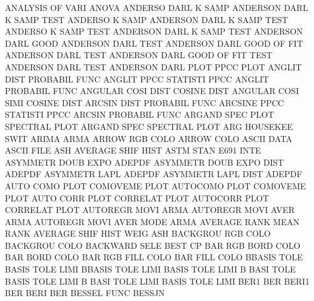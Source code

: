 ANALYSIS OF   VARI                      ANOVA
ANDERSO  DARL K    SAMP                 ANDERSON DARL K    SAMP TEST
ANDERSO  K    SAMP                      ANDERSON DARL K    SAMP TEST
ANDERSO  K    SAMP TEST                 ANDERSON DARL K    SAMP TEST
ANDERSON DARL GOOD                      ANDERSON DARL TEST
ANDERSON DARL GOOD OF   FIT             ANDERSON DARL TEST
ANDERSON DARL GOOD OF   FIT  TEST       ANDERSON DARL TEST
ANDERSON DARL PLOT                      PPCC     PLOT
ANGLIT   DIST                           PROBABIL FUNC
ANGLIT   PPCC                           STATISTI PPCC
ANGLIT                                  PROBABIL FUNC
ANGULAR  COSI DIST                      COSINE   DIST
ANGULAR  COSI SIMI                      COSINE   DIST
ARCSIN   DIST                           PROBABIL FUNC
ARCSINE  PPCC                           STATISTI PPCC
ARCSIN                                  PROBABIL FUNC
ARGAND   SPEC PLOT                      SPECTRAL PLOT
ARGAND   SPEC                           SPECTRAL PLOT
ARG                                     HOUSEKEE SWIT
ARIMA                                   ARMA
ARROW    RGB  COLO                      ARROW    COLO
ASCII    DATA                           ASCII    FILE
ASH                                     AVERAGE  SHIF HIST
ASTM     STAN                           E691     INTE
ASYMMETR DOUB EXPO                      ADEPDF
ASYMMETR DOUB EXPO DIST                 ADEPDF
ASYMMETR LAPL                           ADEPDF
ASYMMETR LAPL DIST                      ADEPDF
AUTO     COMO PLOT                      COMOVEME PLOT
AUTOCOMO PLOT                           COMOVEME PLOT
AUTO     CORR PLOT                      CORRELAT PLOT
AUTOCORR PLOT                           CORRELAT PLOT
AUTOREGR MOVI                           ARMA
AUTOREGR MOVI AVER                      ARMA
AUTOREGR MOVI AVER MODE                 ARMA
AVERAGE  RANK                           MEAN     RANK
AVERAGE  SHIF HIST WEIG                 ASH
BACKGROU RGB  COLO                      BACKGROU COLO
BACKWARD SELE                           BEST     CP
BAR      RGB  BORD COLO                 BAR      BORD COLO
BAR      RGB  FILL COLO                 BAR      FILL COLO
BBASIS   TOLE                           BASIS    TOLE LIMI
BBASIS   TOLE LIMI                      BASIS    TOLE LIMI
B        BASI TOLE                      BASIS    TOLE LIMI
B        BASI TOLE LIMI                 BASIS    TOLE LIMI
BER1                                    BER
BERI1                                   BER
BERI                                    BER
BESSEL   FUNC                           BESSJN
